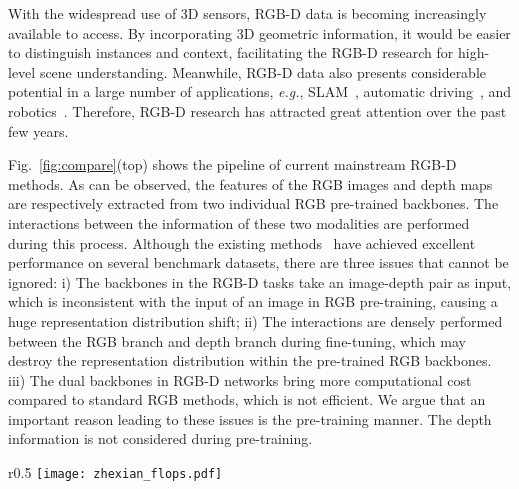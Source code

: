 \documentclass{article}
\newcommand{\figref}[1]{Fig.~\ref{#1}}
\newcommand{\nMethod}{DFormer}
\begin{document}
With the widespread use of 3D sensors, RGB-D data is becoming increasingly available to access.
By incorporating 3D geometric information, it would be easier to distinguish instances and context, facilitating the RGB-D research for high-level scene understanding. 
Meanwhile, RGB-D data also presents considerable potential in a large number of applications, \emph{e.g.}, SLAM~\citep{wang2023co}, automatic driving~\citep{huang2022multi}, and robotics~\citep{marchal2020learning}. 
Therefore, RGB-D research has attracted great attention over the past few years.


\figref{fig:compare}(top) shows the pipeline of current mainstream RGB-D methods. 
As can be observed, the features of the RGB images and depth maps are respectively extracted from two individual RGB pre-trained backbones.
The interactions between the information of these two modalities are performed during this process.
Although the existing methods~\citep{wang2022multimodal,zhang2023delivering} have achieved excellent performance on several benchmark datasets, there are three issues that cannot be ignored: 
i) 
The backbones in the RGB-D tasks take an image-depth pair as input, 
which is inconsistent with the input of an image in RGB pre-training, 
causing a huge representation distribution shift;
ii) 
The interactions are densely performed between the RGB branch and depth branch during fine-tuning, which may destroy the representation distribution within the pre-trained RGB backbones.
iii) The dual backbones in RGB-D networks bring more computational cost compared to standard RGB methods, which is not efficient.
We argue that an important reason leading to these issues is the pre-training manner.
The depth information is not considered during pre-training.




\begin{wrapfigure}{r}{0.5\textwidth}
\vspace{-5.5pt}
\centering
\texttt{[image: zhexian\_flops.pdf]}
\vspace{-20pt}
\caption{\small Performance \emph{vs.} efficiency on NYUDepthv2 dataset~\citep{silberman2012nyu_dataset}. \nMethod{} achieves the state-of-the-art 57.2\% mIoU and the best trade-off compared to other methods.}\label{fig:trade-off}
\vspace{-10pt}
\end{wrapfigure}
\end{document}
